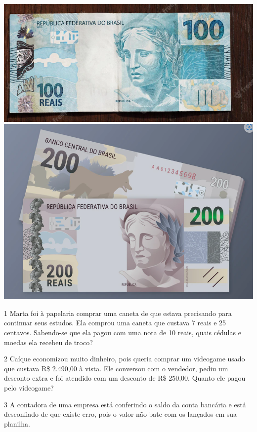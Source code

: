 {\includegraphics[width=.5\textwidth]{./imgs/mat10g.png}
\includegraphics[width=.5\textwidth]{./imgs/mat10h.png}
}


\num{1} Marta foi à papelaria comprar uma caneta de que estava precisando para continuar seus estudos. Ela comprou uma caneta que custava 7 reais e 25
centavos. Sabendo-se que ela pagou com uma nota de 10 reais, quais
cédulas e moedas ela recebeu de troco?



\num{2} Caíque economizou muito dinheiro, pois queria comprar um videogame
usado que custava R\$ 2.490,00 à vista. Ele conversou com o vendedor, pediu um desconto extra e foi atendido com um desconto de R\$ 250,00.
Quanto ele pagou pelo videogame?



\num{3} A contadora de uma empresa está conferindo o saldo da conta
bancária e está desconfiado de que existe erro, pois o valor não bate com
os lançados em sua planilha.

